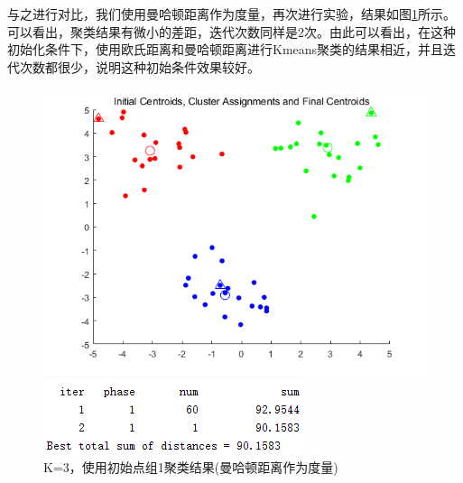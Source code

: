 \documentclass[cn]{elegantbook}
\begin{document}
与之进行对比，我们使用曼哈顿距离作为度量，再次进行实验，结果如图\ref{res311}所示。可以看出，聚类结果有微小的差距，迭代次数同样是2次。由此可以看出，在这种初始化条件下，使用欧氏距离和曼哈顿距离进行Kmeans聚类的结果相近，并且迭代次数都很少，说明这种初始条件效果较好。
\begin{figure}[!h]
	\centering
	\begin{minipage}{0.48\linewidth}
		\centering
		\includegraphics[width=\linewidth]{images/res312}
	\end{minipage}
	\begin{minipage}{0.48\linewidth}
		\centering
		\includegraphics[width=\linewidth]{images/res313}
	\end{minipage}
	\caption{\label{res311}K=3，使用初始点组1聚类结果(曼哈顿距离作为度量)}
\end{figure}
\end{document}
